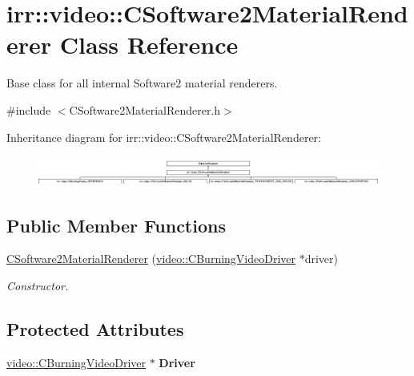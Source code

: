 \hypertarget{classirr_1_1video_1_1_c_software2_material_renderer}{\section{irr\-:\-:video\-:\-:C\-Software2\-Material\-Renderer Class Reference}
\label{classirr_1_1video_1_1_c_software2_material_renderer}
}


Base class for all internal Software2 material renderers.  




{\ttfamily \#include $<$C\-Software2\-Material\-Renderer.\-h$>$}

Inheritance diagram for irr\-:\-:video\-:\-:C\-Software2\-Material\-Renderer\-:\begin{figure}[H]
\begin{center}
\leavevmode
\includegraphics[height=0.992908cm]{classirr_1_1video_1_1_c_software2_material_renderer}
\end{center}
\end{figure}
\subsection*{Public Member Functions}
\begin{DoxyCompactItemize}
\item 
\hypertarget{classirr_1_1video_1_1_c_software2_material_renderer_a7b195346fd535fe53d61f4ba578e05d0}{\hyperlink{classirr_1_1video_1_1_c_software2_material_renderer_a7b195346fd535fe53d61f4ba578e05d0}{C\-Software2\-Material\-Renderer} (\hyperlink{classirr_1_1video_1_1_c_burning_video_driver}{video\-::\-C\-Burning\-Video\-Driver} $\ast$driver)}\label{classirr_1_1video_1_1_c_software2_material_renderer_a7b195346fd535fe53d61f4ba578e05d0}

\begin{DoxyCompactList}\small\item\em Constructor. \end{DoxyCompactList}\end{DoxyCompactItemize}
\subsection*{Protected Attributes}
\begin{DoxyCompactItemize}
\item 
\hypertarget{classirr_1_1video_1_1_c_software2_material_renderer_a8e0d2aec62be07eb83ae4a3c1a1eb5df}{\hyperlink{classirr_1_1video_1_1_c_burning_video_driver}{video\-::\-C\-Burning\-Video\-Driver} $\ast$ {\bfseries Driver}}\label{classirr_1_1video_1_1_c_software2_material_renderer_a8e0d2aec62be07eb83ae4a3c1a1eb5df}

\end{DoxyCompactItemize}


